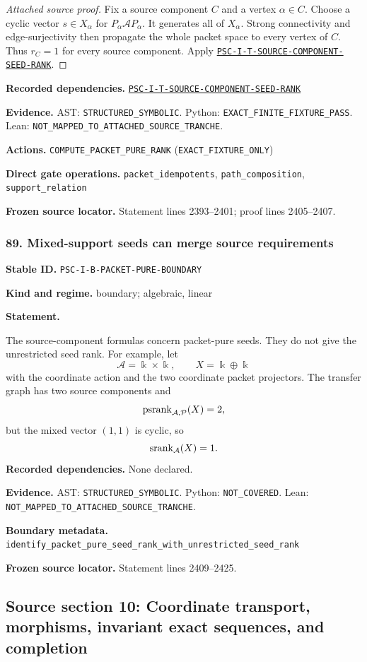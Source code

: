 \documentclass[a4paper,11pt]{article}
\newcommand{\bbk}{\Bbbk}\newcommand{\A}{\mathcal A}\newcommand{\B}{\mathcal B}\newcommand{\Ccal}{\mathcal C}\newcommand{\Pcal}{\mathcal P}\newcommand{\Qcal}{\mathcal Q}\newcommand{\Rcal}{\mathcal R}\newcommand{\Scal}{\mathcal S}
\newcommand{\field}[2]{\noindent\textbf{#1.} #2\par}
\begin{document}
\begin{proof}[Attached source proof]
Fix a source component $C$ and a vertex $\alpha\in C$.  Choose a cyclic vector $s\in X_\alpha$ for $P_\alpha\A P_\alpha$.  It generates all of $X_\alpha$.  Strong connectivity and edge-surjectivity then propagate the whole packet space to every vertex of $C$.  Thus $r_C=1$ for every source component.  Apply \hyperref[rec:PSC-I-T-SOURCE-COMPONENT-SEED-RANK]{\nolinkurl{PSC-I-T-SOURCE-COMPONENT-SEED-RANK}}.
\end{proof}
\field{Recorded dependencies}{\hyperref[rec:PSC-I-T-SOURCE-COMPONENT-SEED-RANK]{\nolinkurl{PSC-I-T-SOURCE-COMPONENT-SEED-RANK}}}
\field{Evidence}{AST: \nolinkurl{STRUCTURED_SYMBOLIC}. Python: \nolinkurl{EXACT_FINITE_FIXTURE_PASS}. Lean: \nolinkurl{NOT_MAPPED_TO_ATTACHED_SOURCE_TRANCHE}.}
\field{Actions}{\nolinkurl{COMPUTE_PACKET_PURE_RANK} (\nolinkurl{EXACT_FIXTURE_ONLY})}
\field{Direct gate operations}{\nolinkurl{packet_idempotents}, \nolinkurl{path_composition}, \nolinkurl{support_relation}}
\field{Frozen source locator}{Statement lines 2393--2401; proof lines 2405--2407.}
\subsubsection*{89. Mixed-support seeds can merge source requirements}
\label{rec:PSC-I-B-PACKET-PURE-BOUNDARY}
\field{Stable ID}{\nolinkurl{PSC-I-B-PACKET-PURE-BOUNDARY}}
\field{Kind and regime}{boundary; algebraic, linear}
\textbf{Statement.}\par
The source-component formulas concern packet-pure seeds.  They do not give the unrestricted seed rank.  For example, let
\[
\A=\bbk\times\bbk,
\qquad
X=\bbk\oplus\bbk
\]
with the coordinate action and the two coordinate packet projectors.  The transfer graph has two source components and
\[
\psrank_{\A,\Pcal}(X)=2,
\]
but the mixed vector $(1,1)$ is cyclic, so
\[
\srank_\A(X)=1.
\]
\field{Recorded dependencies}{None declared.}
\field{Evidence}{AST: \nolinkurl{STRUCTURED_SYMBOLIC}. Python: \nolinkurl{NOT_COVERED}. Lean: \nolinkurl{NOT_MAPPED_TO_ATTACHED_SOURCE_TRANCHE}.}
\field{Boundary metadata}{\nolinkurl{identify_packet_pure_seed_rank_with_unrestricted_seed_rank}}
\field{Frozen source locator}{Statement lines 2409--2425.}
\clearpage\subsection{Source section 10: Coordinate transport, morphisms, invariant exact sequences, and completion}
\end{document}
